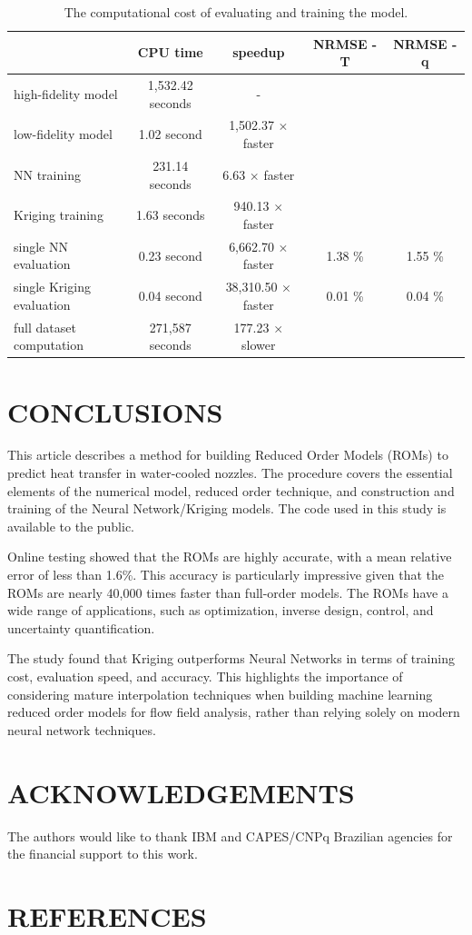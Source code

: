 \documentclass[10pt,fleqn,a4paper,twoside]{article}
\begin{document}
\begin{table}  
	\caption{The computational cost of evaluating and training the model.}
     \label{tab:computcost}  
	\begin{center}
		\begin{tabular}{@{}l|c|c|c|c@{}}                 
            \hline%
            & CPU time & speedup & NRMSE - T & NRMSE - q \\ 
            \hline%
            high-fidelity model  & 1,532.42 seconds & - &  & \\
            low-fidelity model & 1.02 second & 1,502.37 $\times$ faster &  & \\ 
            NN training & 231.14 seconds & 6.63 $\times$ faster  &  & \\
            Kriging training & 1.63 seconds & 940.13 $\times$ faster  &  & \\
            single NN evaluation & 0.23 second  & 6,662.70 $\times$ faster & 1.38 \%  & 1.55 \% \\
            single Kriging evaluation & 0.04 second  & 38,310.50 $\times$ faster & 0.01 \%  & 0.04 \% \\
            full dataset computation & 271,587 seconds & 177.23 $\times$ slower &  & \\
            \hline%
		\end{tabular}
	\end{center}
\end{table}

\section{CONCLUSIONS}

This article describes a method for building Reduced Order Models (ROMs) to predict heat transfer in water-cooled nozzles. The procedure covers the essential elements of the numerical model, reduced order technique, and construction and training of the Neural Network/Kriging models. The code used in this study is available to the public.

Online testing showed that the ROMs are highly accurate, with a mean relative error of less than 1.6\%. This accuracy is particularly impressive given that the ROMs are nearly 40,000 times faster than full-order models. The ROMs have a wide range of applications, such as optimization, inverse design, control, and uncertainty quantification.

The study found that Kriging outperforms Neural Networks in terms of training cost, evaluation speed, and accuracy. This highlights the importance of considering mature interpolation techniques when building machine learning reduced order models for flow field analysis, rather than relying solely on modern neural network techniques.

\section{ACKNOWLEDGEMENTS}

The authors would like to thank IBM and CAPES/CNPq Brazilian agencies for the financial support to this work.


\section{REFERENCES} 
\label{Sec:references}


\renewcommand{\refname}{}

\end{document}

